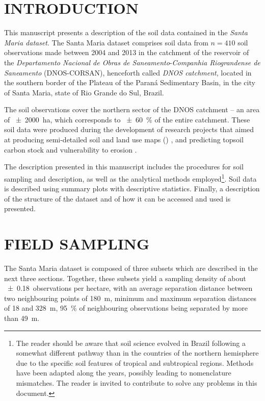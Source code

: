 \formatchapter

\section{INTRODUCTION}
\label{sec:chap04-introduction}

This manuscript presents a description of the soil data contained in the \emph{Santa Maria dataset}. The Santa 
Maria dataset comprises soil data from $n = 410$ soil observations made between \num{2004} and \num{2013} in 
the catchment of the reservoir of the \textit{Departamento Nacional de Obras de Saneamento}-\textit{Companhia 
Riograndense de Saneamento} (DNOS-CORSAN), henceforth called \emph{DNOS catchment}, located in the southern 
border of the Plateau of the Paraná Sedimentary Basin, in the city of Santa Maria, state of Rio Grande do Sul, 
Brazil.

The soil observations cover the northern sector of the DNOS catchment -- an area of \SI{\pm2000}{\hectare}, 
which corresponds to \SI{\pm60}{\percent} of the entire catchment. These soil data were produced during the 
development of research projects that aimed at producing semi-detailed soil and land use maps () 
\cite{Pedron2005, Miguel2010, SamuelRosaEtAl2011a, MiguelEtAl2012}, and predicting topsoil carbon stock and 
vulnerability to erosion \cite{Samuel-Rosa2009, MouraBueno2012, Miguel2013}.

\def\foottropics{\footnote{The reader should be aware that soil science evolved in Brazil following a somewhat 
different pathway than in the countries of the northern hemisphere due to the specific soil features of 
tropical and subtropical regions. Methods have been adapted along the years, possibly leading to nomenclature 
mismatches. The reader is invited to contribute to solve any problems in this document.}}

The description presented in this manuscript includes the procedures for soil sampling and description, as 
well as the analytical methods employed\foottropics{}. Soil data is described using summary plots with 
descriptive statistics. Finally, a description of the structure of the dataset and of how it can be accessed 
and used is presented. 

\section{FIELD SAMPLING}
\label{sec:chap04-sampling}

The Santa Maria dataset is composed of three subsets which are described in the next three sections. Together, 
these subsets yield a sampling density of about \num{\pm0.18}~observations per hectare, with an average 
separation distance between two neighbouring points of \SI{180}{\metre}, minimum and maximum separation 
distances of \num{18} and \SI{328}{\metre}, \SI{95}{\percent} of neighbouring observations being separated by 
more than \SI{49}{\metre}.

